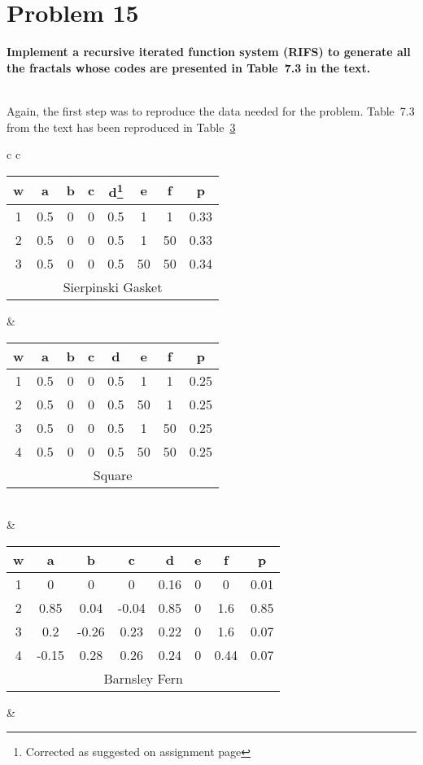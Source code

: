 \section{Problem 15}
\textbf{
Implement a recursive iterated function system (RIFS) to generate all the fractals whose codes are presented in Table~7.3 in the text.
}

\hfill \\

Again, the first step was to reproduce the data needed for the problem. Table~7.3 from the text has been reproduced in Table~\ref{7.3_rep}

\begin{table} \label{7.3_rep}
\begin{tabular}{ c c }
	\begin{tabular}{ c c c c c c c c }
	\hline
	w & a & b & c & d\footnote{Corrected as suggested on assignment page} & e & f & p \\
	\hline
	1 & 0.5 & 0 & 0 & 0.5 & 1 & 1 & 0.33 \\
	2 & 0.5 & 0 & 0 & 0.5 & 1 & 50 & 0.33 \\
	3 & 0.5 & 0 & 0 & 0.5 & 50 & 50 & 0.34 \\
	\hline
	\multicolumn{8}{c}{Sierpinski Gasket}
	\end{tabular} &

	\begin{tabular}{ c c c c c c c c }
	\hline
	w & a & b & c & d & e & f & p \\
	\hline
	1 & 0.5 & 0 & 0 & 0.5 & 1 & 1 & 0.25 \\
	2 & 0.5 & 0 & 0 & 0.5 & 50 & 1 & 0.25 \\
	3 & 0.5 & 0 & 0 & 0.5 & 1 & 50 & 0.25 \\
	4 & 0.5 & 0 & 0 & 0.5 & 50 & 50 & 0.25 \\
	\hline
	\multicolumn{8}{c}{Square}
	\end{tabular} \\
	
	\hfill & \hfill \\
	
	\begin{tabular}{ c c c c c c c c }
	\hline
	w & a & b & c & d & e & f & p \\
	\hline
	1 & 0 & 0 & 0 & 0.16 & 0 & 0 & 0.01 \\
	2 & 0.85 & 0.04 & -0.04 & 0.85 & 0 & 1.6 &0.85 \\
	3 & 0.2 & -0.26 & 0.23 & 0.22 & 0 & 1.6 & 0.07 \\
	4 & -0.15 & 0.28 & 0.26 & 0.24 & 0 & 0.44 & 0.07 \\
	\hline
	\multicolumn{8}{c}{Barnsley Fern}
	\end{tabular} &
	

\end{tabular}
\end{table}
